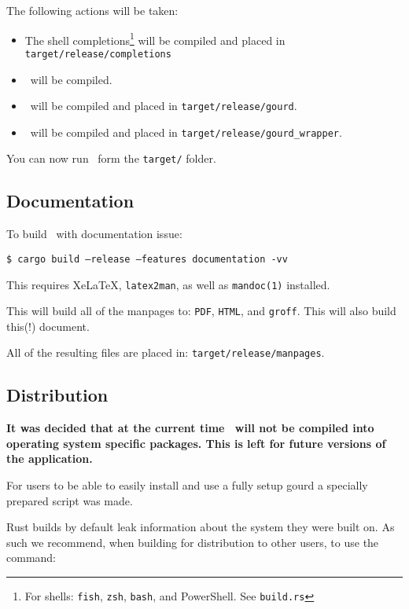 \noindent The following actions will be taken:

\begin{itemize}
  \item The shell completions\footnote{For shells: \texttt{fish}, \texttt{zsh}, \texttt{bash}, and PowerShell. See \texttt{build.rs}}
  will be compiled and placed in \texttt{target/release/completions}
  \item \gourdlib\ will be compiled.
  \item \gourd\ will be compiled and placed in \texttt{target/release/gourd}.
  \item \gourdwrap\ will be compiled and placed in \texttt{target/release/gourd\_wrapper}.
\end{itemize}

You can now run \gourd\ form the \texttt{target/} folder.

\subsection{Documentation}
\label{sec:docbuild}

To build \gourd\ with documentation issue:

\texttt{\$ cargo build --release --features documentation -vv}
\vspace{0.5cm}

\noindent This requires Xe\LaTeX, \texttt{latex2man}, as well as \texttt{mandoc(1)} installed.

This will build all of the manpages to: \texttt{PDF}, \texttt{HTML}, and \texttt{groff}.
This will also build this(!) document.

All of the resulting files are placed in: \texttt{target/release/manpages}.


\subsection{Distribution}
\textcolor{red!30!black}{\textbf{
  It was decided that at the current time \gourd\ will not be compiled into
  operating system specific packages. This is left for future versions of the application.
}}
\vspace{0.3cm}

For users to be able to easily install and use a fully setup gourd a specially prepared script was made.

Rust builds by default leak information about the system they were built on.
As such we recommend, when building for distribution to other users, to use the command:

